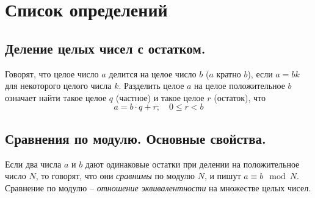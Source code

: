 \section{Список определений}
\begin{samepage}
\subsection{Деление целых чисел с остатком.}
Говорят, что целое число $a$ делится на целое число $b$ ($a$ кратно $b$), если $a = bk$ для некоторого целого числа $k$. Разделить целое $a$ на целое положительное $b$ означает найти такое целое $q$ (частное) и такое целое $r$ (остаток), что
\[
a = b \cdot q + r;
\quad
0 \leqslant r < b
\]


\subsection{Сравнения по модулю. Основные свойства.}
Если два числа $a$ и $b$ дают одинаковые остатки при делении на положительное число $N$, то говорят, что они \textit{сравнимы} по модулю $N$, и пишут $a \equiv b \mod{N}$. Сравнение по модулю -- \textit{отношение эквивалентности} на множестве целых чисел.

\end{samepage}
